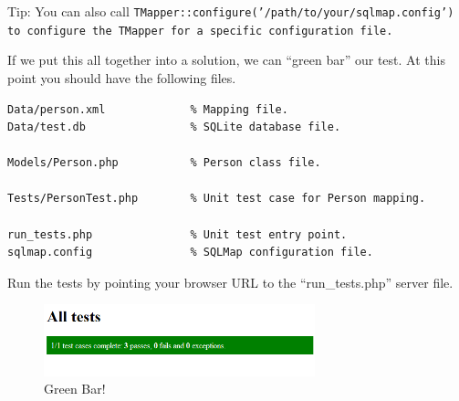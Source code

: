 \begin{mybox}{Tip:}
    You can also call \tt{TMapper::configure('/path/to/your/sqlmap.config')}
    to configure the \tt{TMapper} for a specific configuration file.
\end{mybox}

If we put this all together into a solution, we can ``green bar'' our test. At
this point you should have the following files.
\begin{verbatim}
Data/person.xml             % Mapping file.
Data/test.db                % SQLite database file.

Models/Person.php           % Person class file.

Tests/PersonTest.php        % Unit test case for Person mapping.

run_tests.php               % Unit test entry point.
sqlmap.config               % SQLMap configuration file.
\end{verbatim}

Run the tests by pointing your browser URL to the ``run\_tests.php'' server
file.

\begin{figure}[!h]
    \centering
        \includegraphics[width=0.7\textwidth]{example1}
    \caption{Green Bar!}
    \label{fig:diagram}
\end{figure}

